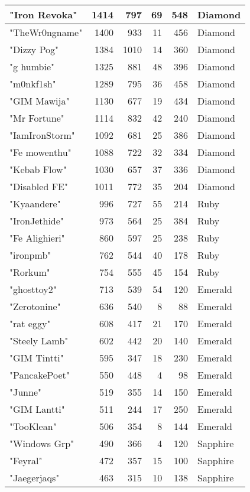 \documentclass{article}
\begin{document}
\begin{table}[htbp]
\begin{tabular}{|l|r|r|r|r|l|}
"Iron Revoka" & 1414 & 797 & 69 & 548 & Diamond \\ \hline
"TheWr0ngname" & 1400 & 933 & 11 & 456 & Diamond \\ \hline
"Dizzy Pog" & 1384 & 1010 & 14 & 360 & Diamond \\ \hline
"g humbie" & 1325 & 881 & 48 & 396 & Diamond \\ \hline
"m0nkf1sh" & 1289 & 795 & 36 & 458 & Diamond \\ \hline
"GIM Mawija" & 1130 & 677 & 19 & 434 & Diamond \\ \hline
"Mr Fortune" & 1114 & 832 & 42 & 240 & Diamond \\ \hline
"IamIronStorm" & 1092 & 681 & 25 & 386 & Diamond \\ \hline
"Fe mowenthu" & 1088 & 722 & 32 & 334 & Diamond \\ \hline
"Kebab Flow" & 1030 & 657 & 37 & 336 & Diamond \\ \hline
"Disabled FE" & 1011 & 772 & 35 & 204 & Diamond \\ \hline
"Kyaandere" & 996 & 727 & 55 & 214 & Ruby \\ \hline
"IronJethide" & 973 & 564 & 25 & 384 & Ruby \\ \hline
"Fe Alighieri" & 860 & 597 & 25 & 238 & Ruby \\ \hline
"ironpmb" & 762 & 544 & 40 & 178 & Ruby \\ \hline
"Rorkum" & 754 & 555 & 45 & 154 & Ruby \\ \hline
"ghosttoy2" & 713 & 539 & 54 & 120 & Emerald \\ \hline
"Zerotonine" & 636 & 540 & 8 & 88 & Emerald \\ \hline
"rat eggy" & 608 & 417 & 21 & 170 & Emerald \\ \hline
"Steely Lamb" & 602 & 442 & 20 & 140 & Emerald \\ \hline
"GIM Tintti" & 595 & 347 & 18 & 230 & Emerald \\ \hline
"PancakePoet" & 550 & 448 & 4 & 98 & Emerald \\ \hline
"Junne" & 519 & 355 & 14 & 150 & Emerald \\ \hline
"GIM Lantti" & 511 & 244 & 17 & 250 & Emerald \\ \hline
"TooKlean" & 506 & 354 & 8 & 144 & Emerald \\ \hline
"Windows Grp" & 490 & 366 & 4 & 120 & Sapphire \\ \hline
"Feyral" & 472 & 357 & 15 & 100 & Sapphire \\ \hline
"Jaegerjaqs" & 463 & 315 & 10 & 138 & Sapphire \\ \hline

\end{tabular}
\end{table}
\end{document}
